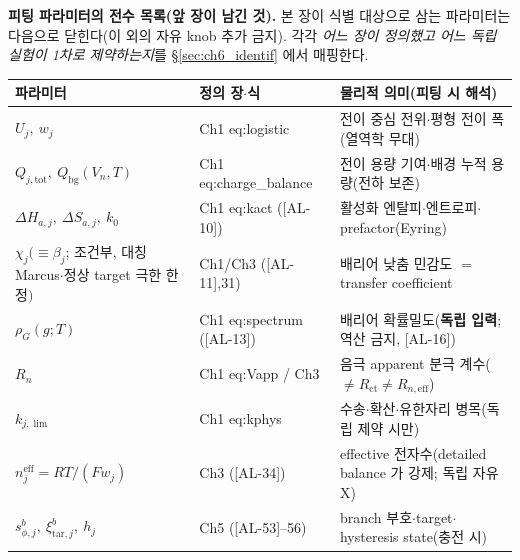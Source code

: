 \documentclass[11pt,a4paper]{article}
\newcommand{\eff}{\mathrm{eff}}
\newcommand{\bg}{\mathrm{bg}}
\newcommand{\tot}{\mathrm{tot}}
\newcommand{\ct}{\mathrm{ct}}
\newcommand{\tar}{\mathrm{tar}}
\newcommand{\AL}[1]{\textsf{[AL-#1]}}
\begin{document}
\textbf{피팅 파라미터의 전수 목록(앞 장이 남긴 것).} 본 장이 식별 대상으로 삼는 파라미터는 다음으로 닫힌다(이 외의
자유 knob 추가 금지). 각각 \emph{어느 장이 정의했고 어느 독립 실험이 1차로 제약하는지}를 \S\ref{sec:ch6_identif}
에서 매핑한다.
\begin{longtable}{p{} p{} p{}}
\toprule 파라미터 & 정의 장$\cdot$식 & 물리적 의미(피팅 시 해석) \\ \midrule \endhead
$U_j,\ w_j$ & Ch1 eq:logistic & 전이 중심 전위$\cdot$평형 전이 폭(열역학 무대) \\
$Q_{j,\tot},\ Q_\bg(V_n,T)$ & Ch1 eq:charge\_balance & 전이 용량 기여$\cdot$배경 누적 용량(전하 보존) \\
$\Delta H_{a,j},\ \Delta S_{a,j},\ k_0$ & Ch1 eq:kact (\AL{10}) & 활성화 엔탈피$\cdot$엔트로피$\cdot$prefactor(Eyring) \\
$\chi_j(\equiv\beta_j$; 조건부, 대칭 Marcus$\cdot$정상 target 극한 한정$)$ & Ch1/Ch3 (\AL{11},31) & 배리어 낮춤 민감도 $=$ transfer coefficient \\
$\rho_G(g;T)$ & Ch1 eq:spectrum (\AL{13}) & 배리어 확률밀도(\textbf{독립 입력}; 역산 금지, \AL{16}) \\
$R_n$ & Ch1 eq:Vapp / Ch3 & 음극 apparent 분극 계수($\ne R_\ct\ne R_{n,\eff}$) \\
$k_{j,\lim}$ & Ch1 eq:kphys & 수송$\cdot$확산$\cdot$유한자리 병목(독립 제약 시만) \\
$n_j^{\eff}=RT/(Fw_j)$ & Ch3 (\AL{34}) & effective 전자수(detailed balance 가 강제; 독립 자유 X) \\
$s_{\phi,j}^b,\ \xi_{\tar,j}^b,\ h_j$ & Ch5 (\AL{53}--56) & branch 부호$\cdot$target$\cdot$hysteresis state(충전 시) \\
\bottomrule
\end{longtable}

\end{document}
